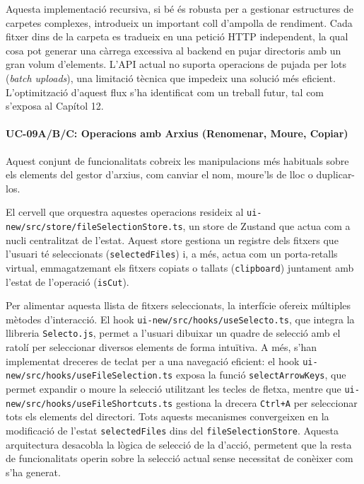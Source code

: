 Aquesta implementació recursiva, si bé és robusta per a gestionar estructures de carpetes complexes, introdueix un important coll d'ampolla de rendiment. Cada fitxer dins de la carpeta es tradueix en una petició HTTP independent, la qual cosa pot generar una càrrega excessiva al backend en pujar directoris amb un gran volum d'elements. L'API actual no suporta operacions de pujada per lots (\textit{batch uploads}), una limitació tècnica que impedeix una solució més eficient. L'optimització d'aquest flux s'ha identificat com un treball futur, tal com s'exposa al Capítol 12.

\paragraph{UC-09A/B/C: Operacions amb Arxius (Renomenar, Moure, Copiar)}
Aquest conjunt de funcionalitats cobreix les manipulacions més habituals sobre els elements del gestor d'arxius, com canviar el nom, moure'ls de lloc o duplicar-los.

El cervell que orquestra aquestes operacions resideix al \texttt{ui-new/src/store/fileSelectionStore.ts}, un store de Zustand que actua com a nucli centralitzat de l'estat. Aquest store gestiona un registre dels fitxers que l'usuari té seleccionats (\texttt{selectedFiles}) i, a més, actua com un porta-retalls virtual, emmagatzemant els fitxers copiats o tallats (\texttt{clipboard}) juntament amb l'estat de l'operació (\texttt{isCut}).

Per alimentar aquesta llista de fitxers seleccionats, la interfície ofereix múltiples mètodes d'interacció. El hook \texttt{ui-new/src/hooks/useSelecto.ts}, que integra la llibreria \texttt{Selecto.js}, permet a l'usuari dibuixar un quadre de selecció amb el ratolí per seleccionar diversos elements de forma intuïtiva. A més, s'han implementat dreceres de teclat per a una navegació eficient: el hook \texttt{ui-new/src/hooks/useFileSelection.ts} exposa la funció \texttt{selectArrowKeys}, que permet expandir o moure la selecció utilitzant les tecles de fletxa, mentre que \texttt{ui-new/src/hooks/useFileShortcuts.ts} gestiona la drecera \texttt{Ctrl+A} per seleccionar tots els elements del directori. Tots aquests mecanismes convergeixen en la modificació de l'estat \texttt{selectedFiles} dins del \texttt{fileSelectionStore}. Aquesta arquitectura desacobla la lògica de selecció de la d'acció, permetent que la resta de funcionalitats operin sobre la selecció actual sense necessitat de conèixer com s'ha generat.


